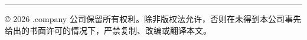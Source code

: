 \noindent \rule{\textwidth}{1pt}

© 2026 {{{ .company }}} 公司保留所有权利。除非版权法允许，否则在未得到本公司事先给出的书面许可的情况下，严禁复制、改编或翻译本文。
